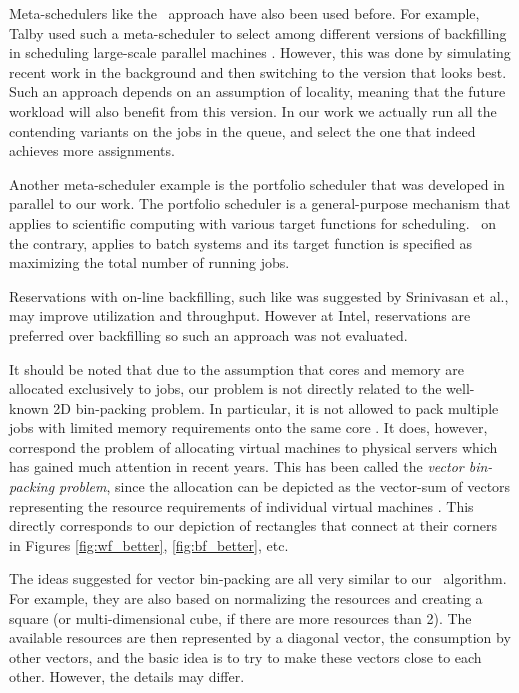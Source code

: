 Meta-schedulers like the \maj\ approach have also been used before.
For example, Talby used such a meta-scheduler to select among different
versions of backfilling in scheduling large-scale parallel machines
\cite{talby05}.
However, this was done by simulating recent work in the background and
then switching to the version that looks best.
Such an approach depends on an assumption of locality, meaning that
the future workload will also benefit from this version.
In our work we actually run all the contending variants on the jobs in
the queue, and select the one that indeed achieves more assignments.

Another meta-scheduler example is the portfolio scheduler
\cite{Deng1305Protfolio} that was developed in parallel to our work. The
portfolio scheduler is a general-purpose mechanism that applies
to scientific computing with various target functions for scheduling. \maj\ on
the contrary, applies to batch systems and its target function is specified as
maximizing the total number of running jobs.

Reservations with on-line backfilling, such like was suggested by 
Srinivasan et al.\cite{Srinivasan2002}, may improve utilization and throughput.
However at Intel, reservations are preferred over backfilling so such an approach was not evaluated.

It should be noted that due to the assumption that cores and memory
are allocated exclusively to jobs, our problem is not directly related
to the well-known 2D bin-packing problem.
In particular, it is not allowed to pack multiple jobs with limited
memory requirements onto the same core \cite{mishra11}. 
It does, however, correspond the problem of allocating virtual machines
to physical servers which has gained much attention in recent years.
This has been called the \emph{vector bin-packing problem}, since the
allocation can be depicted as the vector-sum of vectors representing
the resource requirements of individual virtual machines \cite{panigrahy11}.
This directly corresponds to our depiction of rectangles that connect
at their corners in Figures \ref{fig:wf_better}, \ref{fig:bf_better}, etc.

The ideas suggested for vector bin-packing are all very similar to our
\mif\ algorithm.
For example, they are also based on normalizing the resources and
creating a square (or multi-dimensional cube, if there are more
resources than 2).
The available resources are then represented by a diagonal vector, the
consumption by other vectors, and the basic idea is to try to make
these vectors close to each other.
However, the details may differ.


